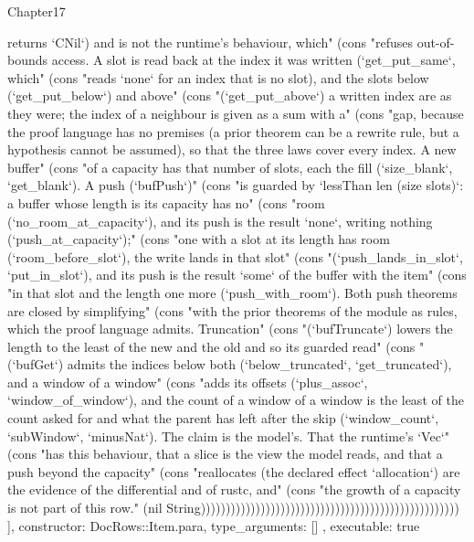 \begin{lexlean}{Chapter17}
\begin{semanticmodule}
{{returns `CNil`) and is not the runtime's behaviour, which" (cons "refuses out-of-bounds access. A slot is read back at the index it was written (`get_put_same`, which" (cons "reads `none` for an index that is no slot), and the slots below (`get_put_below`) and above" (cons "(`get_put_above`) a written index are as they were; the index of a neighbour is given as a sum with a" (cons "gap, because the proof language has no premises (a prior theorem can be a rewrite rule, but a hypothesis cannot be assumed), so that the three laws cover every index. A new buffer" (cons "of a capacity has that number of slots, each the fill (`size_blank`, `get_blank`). A push (`bufPush`)" (cons "is guarded by `lessThan len (size slots)`: a buffer whose length is its capacity has no" (cons "room (`no_room_at_capacity`), and its push is the result `none`, writing nothing (`push_at_capacity`);" (cons "one with a slot at its length has room (`room_before_slot`), the write lands in that slot" (cons "(`push_lands_in_slot`, `put_in_slot`), and its push is the result `some` of the buffer with the item" (cons "in that slot and the length one more (`push_with_room`). Both push theorems are closed by simplifying" (cons "with the prior theorems of the module as rules, which the proof language admits. Truncation" (cons "(`bufTruncate`) lowers the length to the least of the new and the old and so its guarded read" (cons "(`bufGet`) admits the indices below both (`below_truncated`, `get_truncated`), and a window of a window" (cons "adds its offsets (`plus_assoc`, `window_of_window`), and the count of a window of a window is the least of the count asked for and what the parent has left after the skip (`window_count`, `subWindow`, `minusNat`). The claim is the model's. That the runtime's `Vec`" (cons "has this behaviour, that a slice is the view the model reads, and that a push beyond the capacity" (cons "reallocates (the declared effect `allocation`) are the evidence of the differential and of rustc, and" (cons "the growth of a capacity is not part of this row." (nil String))))))))))))))))))))))))))))))))))))))))))))))))))))
    ],
    constructor: DocRows::Item.para,
    type_arguments: []
  },
  executable: true
}


\end{semanticmodule}
\end{lexlean}

